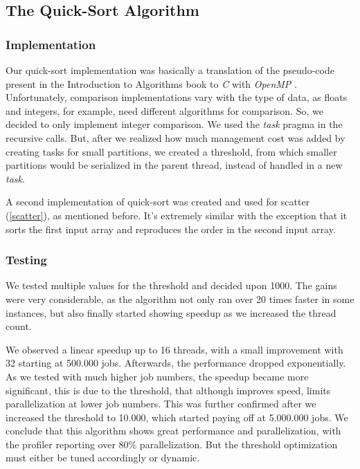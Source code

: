 \documentclass[10pt,journal]{IEEEtran}
\begin{document}
\subsection{The Quick-Sort Algorithm}

\subsubsection{Implementation}

Our quick-sort implementation was basically a translation of the pseudo-code present in the Introduction to Algorithms book to \textit{C} with \textit{OpenMP} \cite{introalgs}. Unfortunately, comparison implementations vary with the type of data, as floats and integers, for example, need different algorithms for comparison. So, we decided to only implement integer comparison. We used the \textit{task} pragma in the recursive calls. But, after we realized how much management cost was added by creating tasks for small partitions, we created a threshold, from which smaller partitions would be serialized in the parent thread, instead of handled in a new \textit{task}. 

A second implementation of quick-sort was created and used for scatter (\ref{scatter}), as mentioned before. It's extremely similar with the exception that it sorts the first input array and reproduces the order in the second input array.

\subsubsection{Testing}

We tested multiple values for the threshold and decided upon 1000. The gains were very considerable, as the algorithm not only ran over 20 times faster in some instances, but also finally started showing speedup as we increased the thread count.

We observed a linear speedup up to 16 threads, with a small improvement with 32 starting at 500.000 jobs. Afterwards, the performance dropped exponentially. As we tested with much higher job numbers, the speedup became more significant, this is due to the threshold, that although improves speed, limits parallelization at lower job numbers. This was further confirmed after we increased the threshold to 10.000, which started paying off at 5.000.000 jobs. We conclude that this algorithm shows great performance and parallelization, with the profiler reporting over 80\% parallelization. But the threshold optimization must either be tuned accordingly or dynamic.
\end{document}
